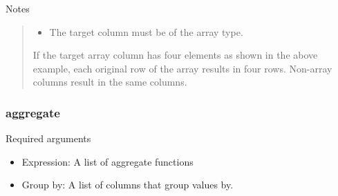 \documentclass[letterpaper,10pt,english]{sphinxmanual}
\begin{document}
Notes
\begin{quote}
\begin{itemize}
\item {} 
The target column must be of the array type.
\begin{quote}

\begin{figure}[H]
\centering

\noindent{}
\end{figure}
\end{quote}

\end{itemize}

If the target array column has four elements as shown in the above example, each original row of the array results in four rows. Non-array columns result in the same columns.
\begin{quote}

\begin{figure}[H]
\centering

\noindent{}
\end{figure}
\end{quote}
\end{quote}


\subsubsection{aggregate}
\label{\detokenize{discovery/part07/rule_kinds:aggregate}}
\begin{figure}[H]
\centering

\noindent{}
\end{figure}

Required arguments
\begin{itemize}
\item {} 
Expression: A list of aggregate functions

\item {} 
Group by: A list of columns that group values by.

\end{itemize}
\end{document}
